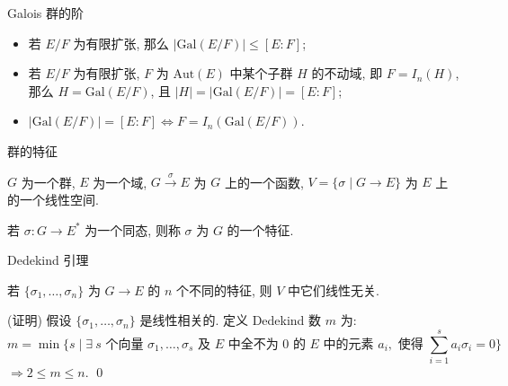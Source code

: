 \begin{frame}{Galois 群的阶}

\begin{thm}
\begin{itemize}
\item[(i)] 若 $E/F$ 为有限扩张, 那么
  $|\mathrm{Gal}(E/F)| \leq [E:F]$;
\item[(ii)] 若 $E/F$ 为有限扩张, $F$ 为 $\mathrm{Aut}(E)$ 中某个子群 $H$
  的不动域, 即 $F = I_n(H)$, 那么 $H = \mathrm{Gal}(E/F)$,
  且 $|H| = |\mathrm{Gal}(E/F)| = [E:F]$;
\item[(iii)] $|\mathrm{Gal}(E/F)| = [E:F] \iff F = I_n(\mathrm{Gal}(E/F))$.
\end{itemize}
\end{thm}

\end{frame}


\begin{frame}{群的特征}

$G$ 为一个群, $E$ 为一个域, $G \xrightarrow{\ \sigma\ } E$ 为 $G$ 上的一个函数,
$V = \{ \sigma \mid G \to E \}$ 为 $E$ 上的一个线性空间.

\pause

若 $\sigma: G \to E^{*}$ 为一个同态, 则称 $\sigma$ 为 $G$ 的一个特征.

\end{frame}


\begin{frame}{Dedekind 引理}

\begin{lem}[Dedekind 引理]
若 $\{ \sigma_1, \dots, \sigma_n \}$ 为 $G \to E$ 的 $n$ 个不同的特征,
则 $V$ 中它们线性无关.
\end{lem}

\startproof[bg=yellow, fg=red](证明)
假设 $\{ \sigma_1, \dots, \sigma_n \}$ 是线性相关的.
定义 Dedekind 数 $m$ 为:
\[
m = \min \big\{ s \mid \exists\ s \text{ 个向量 } \sigma_1, \dots, \sigma_s
\text{ 及 } E \text{ 中全不为 } 0 \text{ 的 } E \text{ 中的元素 } a_i,
\text{ 使得 } \sum_{i=1}^{s} a_i \sigma_i = 0 \big\}
\]
$\Longrightarrow 2 \leq m \leq n$.
\qed

\end{frame}


